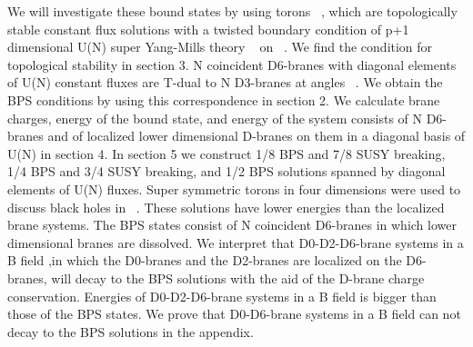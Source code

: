 \documentclass[a4paper,12pt]{article}
\begin{document}
 We will investigate these bound states by using torons ~\cite{thooft}, which are topologically stable constant flux solutions with a twisted boundary condition of p+1 dimensional U(N) super Yang-Mills theory ~\cite{SYM} on \coordHE{} ~\cite{taylor, toron}. We find the condition for topological stability in section 3. N coincident D6-branes with diagonal elements of U(N) constant fluxes are T-dual to N D3-branes at angles ~\cite{angle,jabbariangle, p-p'}. We obtain the BPS conditions by using this correspondence in section 2. We calculate brane charges, energy of the bound state, and energy of the system consists of N D6-branes and of localized lower dimensional D-branes on them in a diagonal basis of U(N) in section 4. In section 5 we construct 1/8 BPS and 7/8 SUSY breaking, 1/4 BPS and 3/4 SUSY breaking, and 1/2 BPS solutions spanned by diagonal elements of U(N) fluxes. Super symmetric torons in four dimensions were used to discuss black holes in ~\cite{perry, costa}. These solutions have lower energies than the localized brane systems. The BPS states consist of N coincident D6-branes in which lower dimensional branes are dissolved. We interpret that D0-D2-D6-brane systems in a B field ,in which the D0-branes and the D2-branes are localized on the D6-branes, will decay to the BPS solutions with the aid of the D-brane charge conservation. Energies of  D0-D2-D6-brane systems in a B field is bigger than those of the BPS states. We prove that D0-D6-brane systems in a B field can not decay to the BPS solutions in the appendix. 
\end{document}
